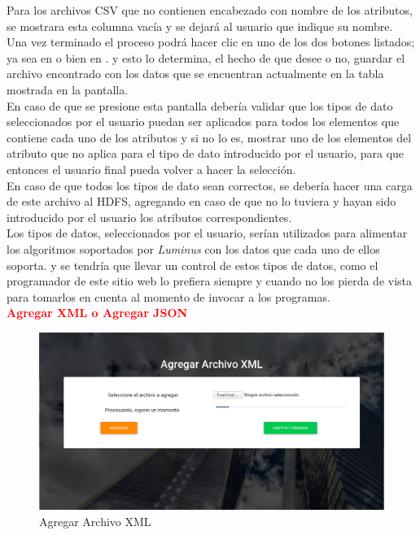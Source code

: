 Para los archivos CSV que no contienen encabezado con nombre de los atributos, se mostrara esta columna vacía y se dejará al usuario que indique su nombre.\\
Una vez terminado el proceso podrá hacer clic en uno de los dos botones listados; ya sea en  o bien en . y esto lo determina, el hecho de que desee o no, guardar el archivo encontrado con los datos que se encuentran actualmente en la tabla mostrada en la pantalla.\\
En caso de que se presione  esta pantalla debería validar que los tipos de dato seleccionados por el usuario puedan ser aplicados para todos los elementos que contiene cada uno de los atributos y si no lo es, mostrar uno de los elementos del atributo que no aplica para el tipo de dato introducido por el usuario, para que entonces el usuario final pueda volver a hacer la selección.\\
En caso de que todos los tipos de dato sean correctos, se debería hacer una carga de este archivo al HDFS, agregando en caso de que no lo tuviera y hayan sido introducido por el usuario los atributos correspondientes.\\
Los tipos de datos, seleccionados por el usuario, serían utilizados para alimentar los algoritmos soportados por \emph{Luminus} con los datos que cada uno de ellos soporta. y se tendría que llevar un control de estos tipos de datos, como el programador de este sitio web lo prefiera siempre y cuando no los pierda de vista para tomarlos en cuenta al momento de invocar a los programas.\\
\textbf{\textcolor{red}{Agregar XML o Agregar JSON}}
\begin{figure}[H]
	\hypertarget{fig:red}{\hspace{1pt}}
	\begin{center}
		\includegraphics[width=1\textwidth]{capitulo7/images/agregarXML.png}
		\caption{Agregar Archivo XML}
		\label{fig:XML}
	\end{center}
\end{figure}
